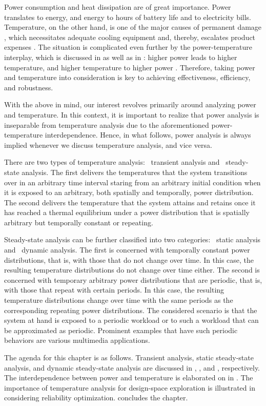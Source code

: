 Power consumption and heat dissipation are of great importance. Power translates
to energy, and energy to hours of battery life and to electricity bills.
Temperature, on the other hand, is one of the major causes of permanent damage
\cite{jedec2016}, which necessitates adequate cooling equipment and, thereby,
escalates product expenses \cite{chaudhry2015}. The situation is complicated
even further by the power-temperature interplay, which is discussed in
 as well as in : higher
power leads to higher temperature, and higher temperature to higher power
\cite{liu2007}. Therefore, taking power and temperature into consideration is
key to achieving effectiveness, efficiency, and robustness.

With the above in mind, our interest revolves primarily around analyzing power
and temperature. In this context, it is important to realize that power analysis
is inseparable from temperature analysis due to the aforementioned
power-temperature interdependence. Hence, in what follows, power analysis is
always implied whenever we discuss temperature analysis, and vice versa.

There are two types of temperature analysis: \one~transient analysis and
\two~steady-state analysis. The first delivers the temperatures that the system
transitions over in an arbitrary time interval staring from an arbitrary initial
condition when it is exposed to an arbitrary, both spatially and temporally,
power distribution. The second delivers the temperature that the system attains
and retains once it has reached a thermal equilibrium under a power distribution
that is spatially arbitrary but temporally constant or repeating.

Steady-state analysis can be further classified into two categories: \one~static
analysis and \two~dynamic analysis. The first is concerned with temporally
constant power distributions, that is, with those that do not change over time.
In this case, the resulting temperature distributions do not change over time
either. The second is concerned with temporary arbitrary power distributions
that are periodic, that is, with those that repeat with certain periods. In this
case, the resulting temperature distributions change over time with the same
periods as the corresponding repeating power distributions. The considered
scenario is that the system at hand is exposed to a periodic workload or to such
a workload that can be approximated as periodic. Prominent examples that have
such periodic behaviors are various multimedia applications.

The agenda for this chapter is as follows. Transient analysis, static
steady-state analysis, and dynamic steady-state analysis are discussed in
, , and
, respectively. The interdependence between
power and temperature is elaborated on in .
The importance of temperature analysis for design-space exploration is
illustrated in  considering reliability
optimization.  concludes the chapter.
